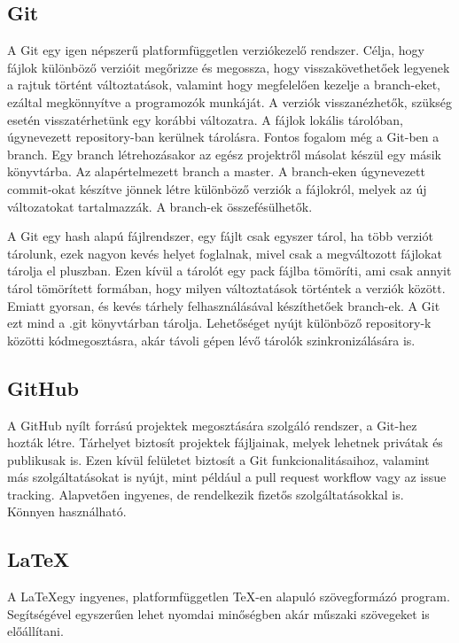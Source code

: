 \subsection*{Git} 

A Git egy igen népszerű platformfüggetlen verziókezelő rendszer.
Célja, hogy fájlok különböző verzióit megőrizze és megossza, hogy visszakövethetőek legyenek a rajtuk történt változtatások, valamint hogy megfelelően kezelje a branch-eket, ezáltal megkönnyítve a programozók munkáját.
A verziók visszanézhetők, szükség esetén visszatérhetünk egy korábbi változatra.
A fájlok lokális tárolóban, úgynevezett repository-ban kerülnek tárolásra.
Fontos fogalom még a Git-ben a branch. Egy branch létrehozásakor az egész projektről másolat készül egy másik könyvtárba.
Az alapértelmezett branch a master.
A branch-eken úgynevezett commit-okat készítve jönnek létre különböző verziók a fájlokról, melyek az új változatokat tartalmazzák.
A branch-ek összefésülhetők. 

A Git egy hash alapú fájlrendszer, egy fájlt csak egyszer tárol, ha több verziót tárolunk, ezek nagyon kevés helyet foglalnak, mivel csak a megváltozott fájlokat tárolja el pluszban.\cite{git}
Ezen kívül a tárolót egy pack fájlba tömöríti, ami csak annyit tárol tömörített formában, hogy milyen változtatások történtek a verziók között.
Emiatt gyorsan, és kevés tárhely felhasználásával készíthetőek branch-ek.
A Git ezt mind a .git könyvtárban tárolja. 
Lehetőséget nyújt különböző repository-k közötti kódmegosztásra, akár távoli gépen lévő tárolók szinkronizálására is. 

\subsection*{GitHub}

A GitHub nyílt forrású projektek megosztására szolgáló rendszer, a Git-hez hozták létre.
Tárhelyet biztosít projektek fájljainak, melyek lehetnek privátak és publikusak is.
Ezen kívül felületet biztosít a Git funkcionalitásaihoz, valamint más szolgáltatásokat is nyújt, mint például a pull request workflow vagy az issue tracking.
Alapvetően ingyenes, de rendelkezik fizetős szolgáltatásokkal is. Könnyen használható. 

\subsection{\LaTeX}

A \LaTeX egy ingyenes, platformfüggetlen TeX-en alapuló szövegformázó program.
Segítségével egyszerűen lehet nyomdai minőségben akár műszaki szövegeket is előállítani. 

